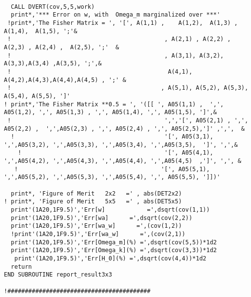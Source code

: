 \documentclass[11pt]{amsart}
\begin{document}
\begin{verbatim}
  
  CALL DVERT(cov,5,5,work)
  print*,'*** Error on w, with  Omega_m marginalized over ***'
 !print*,'The Fisher Matrix = ', '[', A(1,1) ,    A(1,2),  A(1,3) , A(1,4),  A(1,5), ';'&
 !                                            , A(2,1) , A(2,2) ,  A(2,3) , A(2,4) ,  A(2,5), ';'  &
 !                                            , A(3,1), A(3,2), A(3,3),A(3,4) ,A(3,5), ';',&
 !                                             A(4,1), A(4,2),A(4,3),A(4,4),A(4,5) , ';' &
 !                                           , A(5,1), A(5,2), A(5,3), A(5,4), A(5,5), ']'
! print*,'The Fisher Matrix **0.5 = ', '([[ ', A05(1,1) ,  ',',  A05(1,2), ',', A05(1,3) , ',', A05(1,4), ',', A05(1,5), ']',&
 !                                            ',','[', A05(2,1) , ',', A05(2,2) ,  ',',A05(2,3) , ',', A05(2,4) , ',', A05(2,5),']' ,',',  &
  !                                           '[', A05(3,1),  ',',A05(3,2), ',',A05(3,3), ',',A05(3,4), ',',A05(3,5),  ']', ',',&
    !                                         '[', A05(4,1), ',',A05(4,2), ',',A05(4,3), ',',A05(4,4), ',',A05(4,5)  ,']', ',', &
   !                                         '[', A05(5,1), ',',A05(5,2), ',',A05(5,3), ',',A05(5,4), ',', A05(5,5), ']])'                                            
                                             
  print*, 'Figure of Merit   2x2   =' , abs(DET2x2)                                           
! print*, 'Figure of Merit   5x5   =' , abs(DET5x5)
  print'(1A20,1F9.5)','Err[w]            =',dsqrt(cov(1,1))
  print'(1A20,1F9.5)','Err[wa]      =',dsqrt(cov(2,2))
  print'(1A20,1F9.5)','Err[wa_w]      =',(cov(1,2))
  !print'(1A20,1F9.5)','Err[wa_w]      =',(cov(2,1))
  print'(1A20,1F9.5)','Err[Omega_m](%) =',dsqrt(cov(5,5))*1d2
  print'(1A20,1F9.5)','Err[Omega_k](%) =',dsqrt(cov(3,3))*1d2
   print'(1A20,1F9.5)','Err[H_0](%) =',dsqrt(cov(4,4))*1d2
  return
END SUBROUTINE report_result3x3

!#########################################


\end{verbatim}
\end{document}

